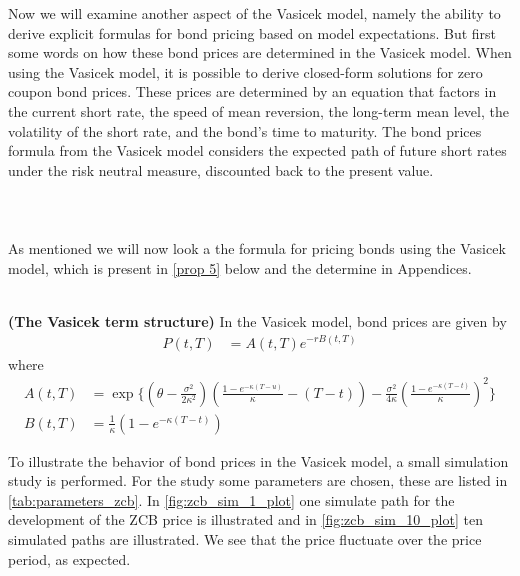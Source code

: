 Now we will examine another aspect of the Vasicek model, namely the ability to derive explicit formulas
for bond pricing based on model expectations.
But first some words on how these bond prices are determined in the Vasicek model. 
When using the Vasicek model, it is possible to derive closed-form solutions for zero coupon bond prices. 
These prices are determined by an equation that factors in the current short rate, the speed of mean reversion,
the long-term mean level, the volatility of the short rate, and the bond’s time to maturity.
The bond prices formula from the Vasicek model considers the expected path of future short 
rates under the risk neutral measure, discounted back to the present value. 
\\\\
\\\\
As mentioned we will now look a the formula for pricing bonds using the Vasicek model,
which is present in \ref{prop 5} below and the determine in Appendices.
\\\\
\begin{proposition}
    \label{prop 5}
    \textbf{(The Vasicek term structure)} In the Vasicek model, bond prices are given by
 \begin{align*}
    P(t,T) &= A(t,T) e^{-rB(t,T)} 
\end{align*}
where
\begin{align*}
    A(t,T)&= \exp \Biggl\{\left(\theta-\frac{\sigma^2}{2 \kappa^2}\right)\left(\frac{1-e^{-\kappa(T-u)}}{\kappa}-(T-t)\right)
    -\frac{\sigma^2}{4 \kappa}\left(\frac{1-e^{-\kappa(T-t)}}{\kappa}\right)^2 \Biggr\} \\
    B(t,T) & =\frac{1}{\kappa} \left( 1 - e^{-\kappa (T-t)} \right)  
\end{align*}
\cite{Bjork}
\end{proposition}
\noindent
To illustrate the behavior of bond prices in the Vasicek model, a small simulation study is performed. For the study 
some parameters are chosen, these are listed in \autoref{tab:parameters_zcb}. In \autoref{fig:zcb_sim_1_plot} one simulate
path for the development of the ZCB price is illustrated and in \autoref{fig:zcb_sim_10_plot} ten simulated paths are illustrated.
We see that the price fluctuate over the price period, as expected.
\\

